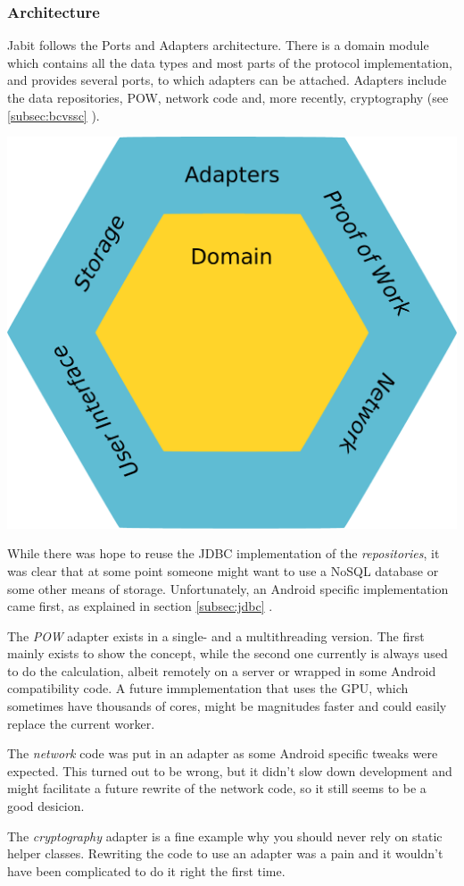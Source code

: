 \documentclass{bfh}
\begin{document}
  \subsubsection{Architecture}
  Jabit follows the Ports and Adapters architecture. There is a domain module which contains all the data types and most parts of the protocol implementation, and provides several ports, to which adapters can be attached. Adapters include the data repositories, \ac{POW}, network code and, more recently, cryptography (see \ref{subsec:bcvssc} ).

  \begin{center}
    \includegraphics[width=0.5 \textwidth]{images/ports_and_adapters.pdf}
  \end{center}

  While there was hope to reuse the \acs{JDBC} implementation of the \textit{repositories}, it was clear that at some point someone might want to use a \acs{NoSQL} database or some other means of storage. Unfortunately, an Android specific implementation came first, as explained in section \ref{subsec:jdbc} .

  The \textit{\acl{POW}} adapter exists in a single- and a multithreading version. The first mainly exists to show the concept, while the second one currently is always used to do the calculation, albeit remotely on a server or wrapped in some Android compatibility code. A future immplementation that uses the \acs{GPU}, which sometimes have thousands of cores, might be magnitudes faster and could easily replace the current worker.

  The \textit{network} code was put in an adapter as some Android specific tweaks were expected. This turned out to be wrong, but it didn't slow down development and might facilitate a future rewrite of the network code, so it still seems to be a good desicion.

  The \textit{cryptography} adapter is a fine example why you should never rely on static helper classes. Rewriting the code to use an adapter was a pain and it wouldn't have been complicated to do it right the first time.
\end{document}
